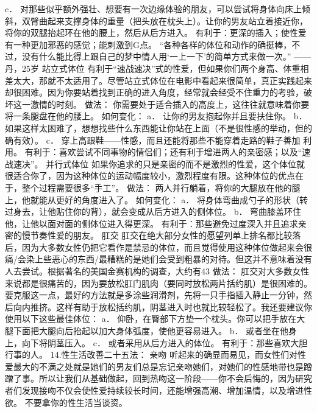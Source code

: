\documentclass[12pt,UTF8]{ctexbook}
\begin{document}
c． 对那些似乎额外强壮、想要有一次边缘体验的朋友，可以尝试将身体向床上倾斜，双臂曲起来支撑身体的重量（把头放在枕头上）。让你的男友站立着接近你，将你的双腿抬起环在他的腰上，然后从后方进入。
有利于：更深的插入；使性爱有一种更加邪恶的感觉；能刺激到G点。
“各种各样的体位和动作的确挺棒，不过，没有什么能比得上跟自己的梦中情人用‘一上一下’的简单方式来做一次。”
——丹，25岁
站立式体位
有利于“速战速决”式的性爱，但如果你们两个身高、体重相差太大，那就不太适用了。尽管站立式体位在电影中看起来很简单，真正实践起来却很困难。因为你要站着找到正确的进入角度，经常就会经受不住重力的考验，破坏这一激情的时刻。
做法：
你需要处于适合插入的高度上，这往往就意味着你要将一条腿盘在他的腰上。
如何变化：
a． 让你的男友抱起你并且要扶住你。
b． 如果这样太困难了，想想找些什么东西能让你站在上面（不是很性感的举动，但的确有效）。
c． 穿上高跟鞋——性感，而且还能将那些不能穿着走路的鞋子善加 利用。
有利于：喜欢尝试不同事物的情侣们；还有利于增进两人的亲密感；以及“速战速决”。
并行式体位
如果你追求的只是亲密的而不是激烈的性爱，这个体位就很适合你了，因为这种体位的运动幅度较小，激烈程度有限。这种体位的优点在于，整个过程需要很多“手工”。
做法：
两人并行躺着，将你的大腿放在他的腿上，他就能从更好的角度进入了。
如何变化：
a． 将身体弯曲成勺子的形状（转过身去，让他贴住你的背），就会变成从后方进入的侧体位。
b． 弯曲膝盖环住他，让他以面对面的侧体位进入得更深。
有利于：那些避免过度深入并且追求亲密的慢节奏性爱的朋友。
肛交
肛交在绝大部分女性的愿望列单上排名都比较落后，因为大多数女性仍把它看作是禁忌的体位，而且觉得使用这种体位做起来会很痛/会染上些恶心的东西/最糟糕的是她们会受到粗暴的对待。但这并不意味着没有人去尝试。根据著名的美国金赛机构的调查，大约有43%
做法：
肛交对大多数女性来说都是很痛苦的，因为要放松肛门肌肉（要同时放松两片括约肌）是很困难的。要克服这一点，最好的方法就是多涂些润滑剂，先将一只手指插入静止一分钟，然后向内推挤。这样有助于放松括约肌，阴茎进入时也就比较轻松了。我还要建议你使用以下这些最佳体位：
a． 仰卧，在臀部下方垫一个枕头。你可以把手放在大腿下面把大腿向后抬起以加大身体弧度，使他更容易进入。
b． 或者坐在他身上，向下将阴茎压入。
c． 或者采用从后方进入的体位。
有利于：那些喜欢大胆行事的人。
14.性生活改善二十五法：
亲吻
听起来的确显而易见，而女性们对性爱最大的不满之处就是她们的男友们总是忘记亲吻她们，对她们的性感地带也是蹭蹭了事。所以让我们从基础做起，回到热吻这一阶段——你不会后悔的，因为研究者们发现接吻不仅会使性爱持续较长时间，还能增强高潮、增加温情，以及增进性欲。
不要拿你的性生活当谈资。
\end{document}
